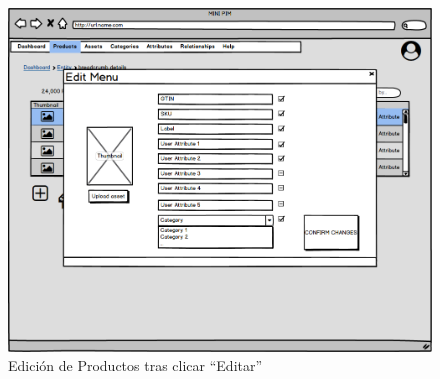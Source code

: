 \begin{figure}[H]
    \includegraphics[width=1\linewidth]{mockups/RF2-X Editar ProductoV2.png}
    \caption{Edición de Productos tras clicar \enquote{Editar}}
   \end{figure}
\vspace{1.0cm}

\newpage %